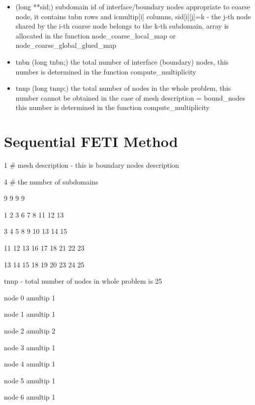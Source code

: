 \begin{itemize}
\item
{\sf (long **sid;)} subdomain id of interface/boundary nodes appropriate to coarse node,
it contains {\sf tnbn} rows and {\sf icmultip[i]} columns,
{\sf sid[i][j]=k} - the j-th node shared by the i-th coarse node belongs to the k-th subdomain,
array is allocated in the function {\sf node\_coarse\_local\_map} or {\sf node\_coarse\_global\_glued\_map}

\item
{\sf tnbn (long tnbn;)} the total number of interface (boundary) nodes,
this number is determined in the function {\sf compute\_multiplicity}

\item
{\sf tnnp (long tnnp;)} the total number of nodes in the whole problem,
this number cannot be obtained in the case of mesh description = bound\_nodes
this number is determined in the function {\sf compute\_multiplicity}
\end{itemize}


\section{Sequential FETI Method}

1 \# mesh description - this is boundary nodes description

4 \# the number of subdomains

9 9 9 9

 1  2  3  6  7  8 11 12 13

 3  4  5  8  9 10 13 14 15

11 12 13 16 17 18 21 22 23

13 14 15 18 19 20 23 24 25


tnnp - total number of nodes in whole problem is 25


 node      0  amultip   1

 node      1  amultip   1

 node      2  amultip   2

 node      3  amultip   1

 node      4  amultip   1

 node      5  amultip   1

 node      6  amultip   1

